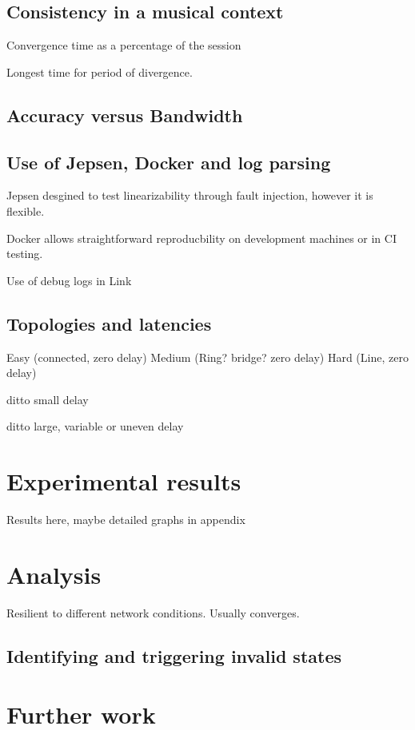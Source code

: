 \documentclass[11pt]{article} %
\theoremstyle{plain}
\theoremstyle{definition}
\begin{document}
\subsection{Consistency in a musical context}

Convergence time as a percentage of the session

Longest time for period of divergence.

\subsection{Accuracy versus Bandwidth}
\subsection{Use of Jepsen, Docker and log parsing}

Jepsen desgined to test linearizability through fault injection, however it is flexible.

Docker allows straightforward reproducbility on development machines or in CI testing.

Use of debug logs in Link

\subsection{Topologies and latencies}

Easy (connected, zero delay)
Medium (Ring? bridge? zero delay)
Hard (Line, zero delay)

ditto small delay

ditto large, variable or uneven delay

\section{Experimental results}

Results here, maybe detailed graphs in appendix

\section{Analysis}

Resilient to different network conditions. Usually converges.

\subsection{Identifying and triggering invalid states}

\section{Further work}
\end{document}
